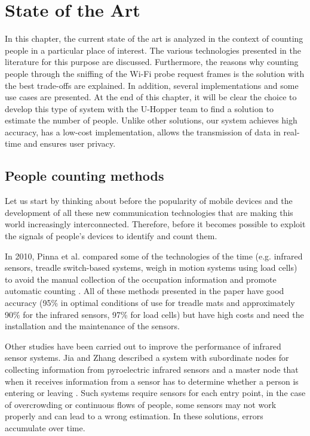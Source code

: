 \chapter{State of the Art}
\label{cha:soa}
\vspace{0.4 cm} 

In this chapter, the current state of the art is analyzed in the context of counting people in a particular place of interest. The various technologies presented in the literature for this purpose are discussed. Furthermore, the reasons why counting people through the sniffing of the Wi-Fi probe request frames is the solution with the best trade-offs are explained. In addition, several implementations and some use cases are presented.
At the end of this chapter, it will be clear the choice to develop this type of system with the U-Hopper team to find a solution to estimate the number of people. Unlike other solutions, our system achieves high accuracy, has a low-cost implementation, allows the transmission of data in real-time and ensures user privacy.


\section{People counting methods}
\label{sec:count}
\vspace{0.2 cm} 

Let us start by thinking about before the popularity of mobile devices and the development of all these new communication technologies that are making this world increasingly interconnected. Therefore, before it becomes possible to exploit the signals of people's devices to identify and count them.

In 2010, Pinna et al. compared some of the technologies of the time (e.g. infrared sensors, treadle switch-based systems, weigh in motion systems using load cells) to avoid the manual collection of the occupation information and promote automatic counting \cite{pinna2010automatic}. All of these methods presented in the paper have good accuracy (95\% in optimal conditions of use for treadle mats and approximately 90\% for the infrared sensors, 97\% for load cells) but have high costs and need the installation and the maintenance of the sensors.

Other studies have been carried out to improve the performance of infrared sensor systems. Jia and Zhang described a system with subordinate nodes for collecting information from pyroelectric infrared sensors and a master node that when it receives information from a sensor has to determine whether a person is entering or leaving \cite{jia2015application}.
Such systems require sensors for each entry point, in the case of overcrowding or continuous flows of people, some sensors may not work properly and can lead to a wrong estimation. In these solutions, errors accumulate over time.

